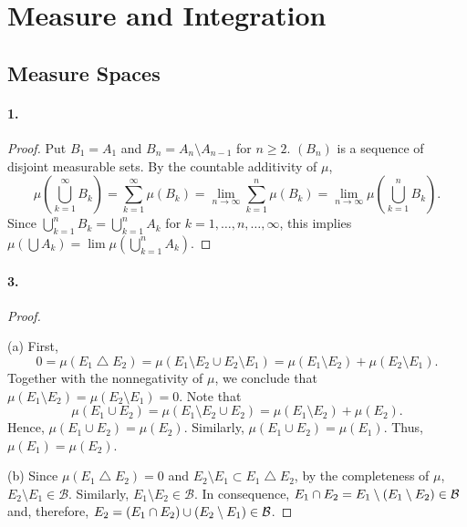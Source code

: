 \section{Measure and Integration}
\subsection{Measure Spaces}
  \paragraph{1.}
  \begin{proof}
    Put $B_1=A_1$ and $B_n=A_n\setminus A_{n-1}$ for $n\ge 2$. $(B_n)$ is a 
    sequence of disjoint measurable sets. By the
    countable additivity of $\mu$,
    \[
      \mu\left(\bigcup_{k=1}^\infty B_k\right)=
      \sum_{k=1}^\infty\mu(B_k)=
      \lim_{n\to\infty}\sum_{k=1}^n\mu(B_k)=
      \lim_{n\to\infty}\mu\left(\bigcup_{k=1}^n B_k\right).
    \]
    Since $\bigcup_{k=1}^n B_k=\bigcup_{k=1}^n A_k$ for $k=1,\dots,n,\dots,
    \infty$, this implies $\mu(\bigcup A_k)=\lim\mu(\bigcup_{k=1}^n A_k)$.
  \end{proof}
  
  \paragraph{3.}
  \begin{proof}
    $\,$\par
    (a) First,
    \[
      0=\mu(E_1\bigtriangleup E_2)=\mu(E_1\setminus E_2\cup E_2\setminus E_1)=
      \mu(E_1\setminus E_2)+\mu(E_2\setminus E_1).
    \]
    Together with the nonnegativity of $\mu$, we conclude that $\mu(E_1
    \setminus E_2)=\mu(E_2\setminus E_1)=0$. Note that
    \[
      \mu(E_1\cup E_2)=\mu(E_1\setminus E_2\cup E_2)=
      \mu(E_1\setminus E_2)+\mu(E_2).
    \]
    Hence, $\mu(E_1\cup E_2)=\mu(E_2)$. Similarly, $\mu(E_1\cup E_2)=\mu(E_1)$.
    Thus, $\mu(E_1)=\mu(E_2)$.\par
    (b) Since $\mu(E_1\bigtriangleup E_2)=0$ and $E_2\setminus E_1\subset E_1
    \bigtriangleup E_2$, by the completeness of $\mu$, $E_2\setminus E_1\in
    \mathcal{B}$. Similarly, $E_1\setminus E_2\in\mathcal{B}$. In consequence,
    $E_1\cap E_2 = E_1\setminus(E_1\setminus E_2)\in\mathcal{B}$ and, therefore,
    $E_2=(E_1\cap E_2)\cup(E_2\setminus E_1)\in\mathcal{B}$.
  \end{proof}
  
